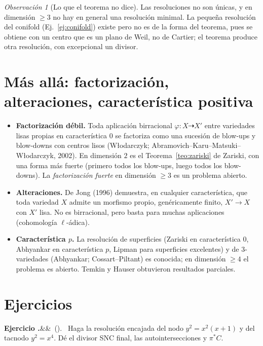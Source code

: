\documentclass[11pt,a4paper,oneside]{book}
\theoremstyle{plain}
\theoremstyle{definition}
\theoremstyle{remark}
\newtheorem{observacion}[teorema]{Observación}
\newcounter{ejer}[chapter]
\renewcommand{\theejer}{\thechapter.\arabic{ejer}}
\newenvironment{ejercicio}[1][]{\refstepcounter{ejer}\par\medskip\noindent\textbf{Ejercicio \theejer}\ifx&#1&\else\ (#1)\fi.\ }{\par}
\begin{document}
\begin{observacion}[Lo que el teorema no dice]
Las resoluciones no son únicas, y en dimensión $\ge3$ no hay en general una resolución minimal. La pequeña resolución del conifold (Ej.~\ref{ej:conifold}) existe pero no es de la forma del teorema, pues se obtiene con un centro que es un plano de Weil, no de Cartier; el teorema produce otra resolución, con excepcional un divisor.
\end{observacion}

\section{Más allá: factorización, alteraciones, característica positiva}

\begin{itemize}
\item \textbf{Factorización débil.} Toda aplicación birracional $\varphi:X\dashrightarrow X'$ entre variedades lisas propias en característica $0$ se factoriza como una sucesión de blow-ups y blow-downs con centros lisos (Włodarczyk; Abramovich--Karu--Matsuki--Włodarczyk, 2002). En dimensión $2$ es el Teorema~\ref{teo:zariski} de Zariski, con una forma más fuerte (primero todos los blow-ups, luego todos los blow-downs). La \emph{factorización fuerte} en dimensión $\ge3$ es un problema abierto.
\item \textbf{Alteraciones.} De Jong (1996) demuestra, en cualquier característica, que toda variedad $X$ admite un morfismo propio, genéricamente finito, $X'\to X$ con $X'$ lisa. No es birracional, pero basta para muchas aplicaciones (cohomología $\ell$-ádica).
\item \textbf{Característica $p$.} La resolución de superficies (Zariski en característica $0$, Abhyankar en característica $p$, Lipman para superficies excelentes) y de $3$-variedades (Abhyankar; Cossart--Piltant) es conocida; en dimensión $\ge4$ el problema es abierto. Temkin y Hauser obtuvieron resultados parciales.
\end{itemize}

\section*{Ejercicios}

\begin{ejercicio}\label{ej:nodo-encajado}
Haga la resolución encajada del nodo $y^2=x^2(x+1)$ y del tacnodo $y^2=x^4$. Dé el divisor SNC final, las autointersecciones y $\pi^*C$.
\end{ejercicio}
\end{document}

